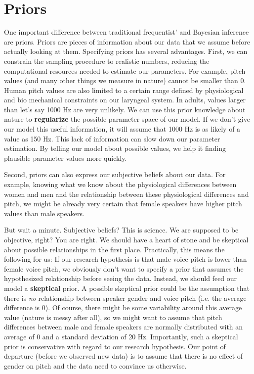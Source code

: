 \documentclass[nobib]{tufte-handout}
\begin{document}
\section{Priors}

One important difference between traditional frequentist' and Bayesian inference are priors. Priors are pieces of information about our data that we assume before actually looking at them. Specifying priors has several advantages. First, we can constrain the  sampling procedure to realistic numbers, reducing the computational resources needed to estimate our parameters. For example, pitch values (and many other things we measure in nature) cannot be smaller than 0. Human pitch values are also limited to a certain range defined by physiological and bio mechanical constraints on our laryngeal system. In adults, values larger than let's say 1000 Hz are very unlikely. We can use this prior knowledge about nature to \textbf{regularize} the possible parameter space of our model. If we don't give our model this useful information, it will assume that 1000 Hz is as likely of a value as 150 Hz. This lack of information can slow down our parameter estimation. By telling our model about possible values, we help it finding plausible parameter values more quickly. 
 
Second, priors can also express our subjective beliefs about our data. For example, knowing what we know about the physiological differences between women and men and the relationship between these physiological differences and pitch, we might be already very certain that female speakers have higher pitch values than male speakers.

But wait a minute. Subjective beliefs? This is science. We are supposed to be objective, right? You are right. We should have a heart of stone and be skeptical about possible relationships in the first place.
Practically, this means the following for us: If our research hypothesis is that male voice pitch is lower than female voice pitch, we obviously don't want to specify a prior that assumes the hypothesized relationship before seeing the data. Instead, we should feed our model a \textbf{skeptical} prior. A possible skeptical prior could be the assumption that there is \textit{no} relationship between speaker gender and voice pitch (i.e. the average difference is 0). Of course, there might be some variability around this average value (nature is messy after all), so we might want to assume that pitch differences between male and female speakers are normally distributed with an average of 0 and a standard deviation of 20 Hz. Importantly, such a skeptical prior is conservative with regard to our research hypothesis. Our point of departure (before we observed new data) is to assume that there is no effect of gender on pitch and the data need to convince us otherwise.
\end{document}
